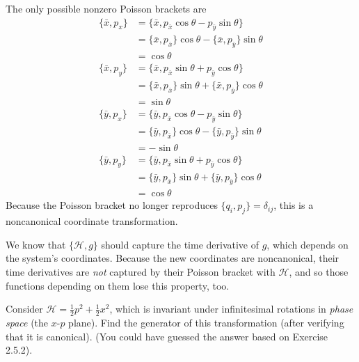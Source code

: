 \documentclass[../principles-of-quantum-mechanics.tex]{subfiles}
\begin{document}
\begin{questions}
\begin{solution}
			The only possible nonzero Poisson brackets are
			\begin{align*}
				\{\bar{x}, p_x\} &= \{\bar{x}, p_{\bar{x}}\cos\theta - p_{\bar{y}}\sin\theta\} \\
				&= \{\bar{x}, p_{\bar{x}}\}\cos\theta - \{\bar{x}, p_{\bar{y}}\}\sin\theta \\
				&= \cos\theta \\
				\{\bar{x}, p_y\} &= \{\bar{x}, p_{\bar{x}}\sin\theta + p_{\bar{y}}\cos\theta\} \\
				&= \{\bar{x}, p_{\bar{x}}\}\sin\theta + \{\bar{x}, p_{\bar{y}}\}\cos\theta \\
				&= \sin\theta \\
				\{\bar{y}, p_x\} &= \{\bar{y}, p_{\bar{x}}\cos\theta - p_{\bar{y}}\sin\theta\} \\
				&= \{\bar{y}, p_{\bar{x}}\}\cos\theta - \{\bar{y}, p_{\bar{y}}\}\sin\theta \\
				&= -\sin\theta \\
				\{\bar{y}, p_y\} &= \{\bar{y}, p_{\bar{x}}\sin\theta + p_{\bar{y}}\cos\theta\} \\
				&= \{\bar{y}, p_{\bar{x}}\}\sin\theta + \{\bar{y}, p_{\bar{y}}\}\cos\theta \\
				&= \cos\theta
			\end{align*}
			Because the Poisson bracket no longer reproduces $\{q_i, p_j\} = \delta_{ij}$, this is a noncanonical coordinate transformation.
			
			We know that $\{\mathcal{H}, g\}$ should capture the time derivative of $g$, which depends on the system's coordinates. Because the new coordinates are noncanonical, their time derivatives are \textit{not} captured by their Poisson bracket with $\mathcal{H}$, and so those functions depending on them lose this property, too.
		\end{solution}
		
		\question Consider $\mathcal{H} = \frac{1}{2}p^2 + \frac{1}{2}x^2$, which is invariant under infinitesimal rotations in \textit{phase space} (the $x$-$p$ plane). Find the generator of this transformation (after verifying that it is canonical). (You could have guessed the answer based on Exercise 2.5.2).
		

\end{questions}
\end{document}
